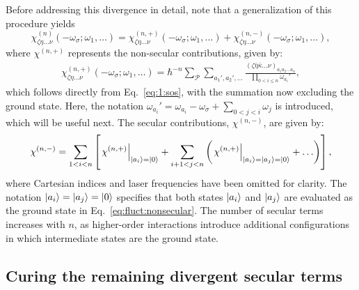 \documentclass[12pt,a4paper]{article}
\begin{document}
Before addressing this divergence in detail, note that a generalization of this procedure yields \begin{equation}
	\chi^{(n)}_{\zeta \eta \ldots \nu}(-\omega_\sigma; \omega_1, \ldots)  = \chi^{(n,+)}_{\zeta \eta \ldots \nu}(-\omega_\sigma; \omega_1, \ldots)  + \chi^{(n,-)}_{\zeta \eta \ldots \nu}(-\omega_\sigma; \omega_1, \ldots) ,\label{eq:fluct}
\end{equation} where $\chi^{(n,+)}$ represents the non-secular contributions, given by:
\begin{align}
	\chi^{(n,+)}_{\zeta \eta \ldots \nu}(-\omega_\sigma; \omega_1, \ldots) = \hbar^{-n} \sum_\mathcal{P} \sum_{a_1', a_2', \ldots} \frac{(\zeta \bar{\eta} \bar{\kappa} \ldots \nu)_{a_1 a_2 \ldots a_n}}{\prod_{0 < i \leq n} \omega_{a_i}'} ,\label{eq:fluct:nonsecular}
\end{align}
which follows directly from Eq.~\eqref{eq:1:sos}, with the summation now excluding the ground state. Here, the notation $\omega_{a_i}' = \omega_{a_i} - \omega_\sigma + \sum_{0 < j < i} \omega_j$ is introduced, which will be useful next.
The secular contributions, $\chi^{(n,-)}$, are given by:
\begin{align}
	\chi^{(n,-)} = \sum_{1 < i < n} \left[ \left. \chi^{(n,+)} \right|_{\ket{a_i} = \ket{0}} + \sum_{i+1 < j < n} \left( \left. \chi^{(n,+)} \right|_{\ket{a_i} = \ket{a_j} = \ket{0}} + \ldots \right) \right],\label{eq:fluct:secular}
\end{align}
where Cartesian indices and laser frequencies have been omitted for clarity. The notation $\ket{a_i} = \ket{a_j} = \ket{0}$ specifies that both states $\ket{a_i}$ and $\ket{a_j}$ are evaluated as the ground state in Eq.~\eqref{eq:fluct:nonsecular}. The number of secular terms increases with $n$, as higher-order interactions introduce additional configurations in which intermediate states are the ground state. 

\subsection{Curing the remaining divergent secular terms}
\end{document}
